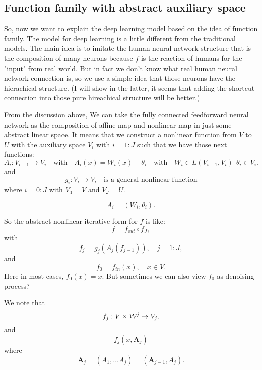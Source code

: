 \subsection{Function family with abstract auxiliary space}
So, now we want to explain the deep learning model based on the idea of function family. The model for deep learning is a little different from the traditional models. The main idea is to imitate the human neural network structure that is the composition of many neurons because $f$ is the reaction of humans for the "input" from real world. But in fact we don't know what real human neural network connection is, so we use a simple idea that those neurons have the hierachical structure. (I will show in the latter, it seems that adding the shortcut connection into those pure hireachical structure will be better.)

From the discussion above, We can take the fully connected feedforward neural network as the composition of affine map and nonlinear map in just some abstract linear space. It means that we construct a nonlinear function from $V$ to $U$ with the auxiliary space $V_i$ with $i = 1:J$ such that we have those next functions:
\begin{equation}\label{equ:affinemap}
A_i: V_{i-1} \to V_i  \quad \text{with} \quad A_i(x) = W_i (x)  + \theta_i  \quad \text{with} \quad W_i \in L(V_{i-1}, V_i) ~~ \theta_i \in V_i.
\end{equation}
and
\begin{equation}
g_i: V_i \to V_i \quad \text{is a general nonlinear function}
\end{equation}
where $i = 0:J$ with $V_0 = V$ and $V_J = U$. 

$$
A_i=(W_i, \theta_i).
$$

So the abstract nonlinear iterative form for $f$ is like:
\begin{equation}\label{equ:abstractNN1}
f = f_{out}\circ f_J,
\end{equation}
with
\begin{equation}\label{equ:abstractNN2}
f_j = g_j(A_j(f_{j-1})), \quad j = 1:J,
\end{equation}
and
\begin{equation}\label{equ:abstractNN3}
f_0 = f_{in}(x), \quad x \in V.
\end{equation}
Here in most cases, $f_0(x)=x$.  But sometimes we can also view $f_0$ as 
denoising process?

We note that
$$
f_j: V\times {\cal W}^j\mapsto V_j. 
$$
and 
$$
f_j(x,{\mathbf A}_j)
$$
where 
$$
{\mathbf A}_j=(A_1,\ldots A_j)=({\mathbf A}_{j-1},A_j).
$$


